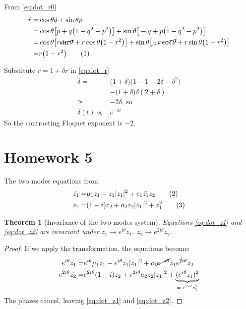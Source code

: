 \documentclass[]{article}
\newcommand\numberthis{\addtocounter{equation}{1}\tag{\theequation}}
\newtheorem{thm}{Theorem}
\begin{document}
From \eqref{eq:dot_r0}
\begin{align*}
	\dot{r} =&	\cos{\theta} \dot{q} + \sin{\theta} \dot{p}\\
	=& 	\cos{\theta} \big[p + q\big(1-q^2-p^2\big)\big] + \sin{\theta} \big[-q + p\big(1-q^2-p^2\big)\big]\\
	=& 	\cos{\theta} \big[r \cancel{\sin{\theta}} + r \cos{\theta}\big(1-r^2\big)\big] + \sin{\theta} \big[\cancel{-r \cos{\theta}} + r \sin{\theta}\big(1-r^2\big)\big]\\
	=& r \big(1-r^2\big) \numberthis \label{eq:dot_r}
\end{align*}

Substitute $r=1+\delta r$ in \eqref{eq:dot_r}
\begin{align*}
	\dot{\delta} =& \big(1+\delta\big)\big(1 -1 -2 \delta - \delta^2\big)\\
	=& - \big(1+\delta\big) \delta (2 + \delta)\\
	\approxeq & - 2 \delta \text{, so}\\
	\delta(t) \propto & e^{-2 t}
\end{align*}
So the contracting Floquet exponent is $-2$.

\section{Homework 5}

The two modes equations from \cite{ChaosBook}
\begin{align*}
	\dot{z_1} =& \mu_1 z_1 - z_1 \vert z_1 \vert^2 + c_1 \bar{z_1} z_2  \numberthis \label{eq:dot_z1}\\
	\dot{z_2} =& (1-i)z_2 + a_2z_2 \vert z_1 \vert^2+z_1^2  \numberthis \label{eq:dot_z2}
\end{align*}


\begin{thm}[Invariance of the two modes system]
	Equations \eqref{eq:dot_z1} and \eqref{eq:dot_z2} are invariant under $z_1 \rightarrow e^{i\theta} z_1,\; z_2 \rightarrow e^{2i\theta} z_2$.
\end{thm}
\begin{proof}
	If we apply the transformation, the equations become:
	\begin{align*}
		e^{i\theta} \dot{z_1} =& e^{i\theta} \mu_1 z_1 - e^{i\theta} z_1 \vert z_1 \vert^2 + c_1 \cancel{e^{-i\theta}}   \bar{z_1} e^{\cancel{2}i\theta} z_2 \\
		e^{2i\theta}\dot{z_2} =& e^{2i\theta} (1-i)z_2 + e^{2i\theta} a_2z_2 \vert z_1 \vert^2+\underbrace{(e^{i\theta}z_1)^2}_\text{$= e^{2i\theta}z_1^2$}
	\end{align*}
	The phases cancel, leaving \eqref{eq:dot_z1} and \eqref{eq:dot_z2}.
\end{proof}
\end{document}
